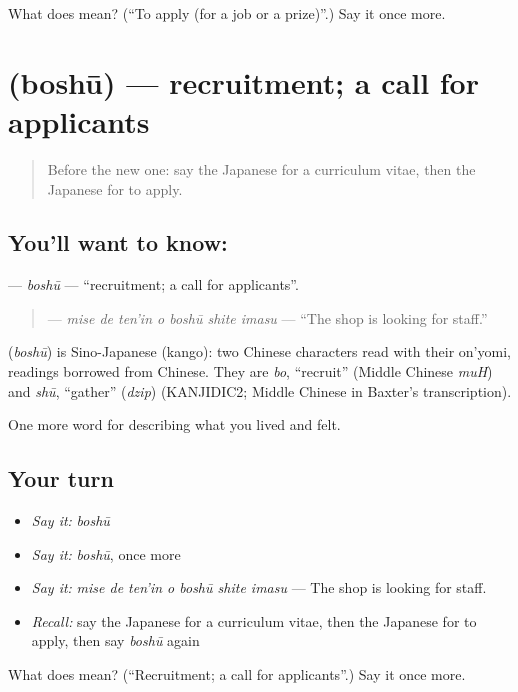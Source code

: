 \begin{tcolorbox}[breakable,colback=teal!4,colframe=teal!35!black,title={Before you move on}]
What does  mean? (\textquotedblleft{}To apply (for a job or a prize)\textquotedblright{}.) Say it once more.
\end{tcolorbox}
\section[\texorpdfstring{\ja{ぼしゅう} (boshū)}{ぼしゅう (boshū)}]{ (boshū) — recruitment; a call for applicants}

\label{lesson:JA-C457-boshuu}



\begin{quote}
Before the new one: say the Japanese for a curriculum vitae, then the Japanese for to apply.
\end{quote}

\subsection*{You'll want to know: }
\textbf{} — \emph{boshū} — \textquotedblleft{}recruitment; a call for applicants\textquotedblright{}.

\begin{quote}
\textbf{  } — \emph{mise de ten'in o boshū shite imasu} — \textquotedblleft{}The shop is looking for staff.\textquotedblright{}
\end{quote}

\begin{cousinweb}
\textbf{} (\emph{boshū}) is Sino-Japanese (kango): two Chinese characters read with their on'yomi, readings borrowed from Chinese. They are \emph{bo}, \textquotedblleft{}recruit\textquotedblright{} (Middle Chinese \emph{muH}) and \emph{shū}, \textquotedblleft{}gather\textquotedblright{} (\emph{dzip}) (KANJIDIC2; Middle Chinese in Baxter's transcription).
\end{cousinweb}

\begin{grammarlens}[title={What you've built}]
One more word for describing what you lived and felt.
\end{grammarlens}

\subsection*{Your turn}
\begin{itemize}
\raggedright
  \item \emph{Say it:} \emph{boshū}
  \item \emph{Say it:} \emph{boshū}, once more
  \item \emph{Say it:} \emph{mise de ten'in o boshū shite imasu} — The shop is looking for staff.
  \item \emph{Recall:} say the Japanese for a curriculum vitae, then the Japanese for to apply, then say \emph{boshū} again
\end{itemize}

\begin{tcolorbox}[breakable,colback=teal!4,colframe=teal!35!black,title={Before you move on}]
What does  mean? (\textquotedblleft{}Recruitment; a call for applicants\textquotedblright{}.) Say it once more.
\end{tcolorbox}
